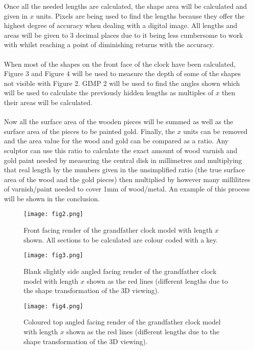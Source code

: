 \documentclass[a4paper,12pt]{article}
\begin{document}
Once all the needed lengths are calculated, the shape area will be calculated and given in $x$ units. Pixels are being used to find the lengths because they offer the highest degree of accuracy when dealing with a digital image. All lengths and areas will be given to 3 decimal places due to it being less cumbersome to work with whilst reaching a point of diminishing returns with the accuracy.\\\\
When most of the shapes on the front face of the clock have been calculated, Figure 3 and Figure 4 will be used to measure the depth of some of the shapes not visible with Figure 2. GIMP 2 will be used to find the angles shown which will be used to calculate the previously hidden lengths as multiples of $x$ then their areas will be calculated.\\\\
Now all the surface area of the wooden pieces will be summed as well as the surface area of the pieces to be painted gold. Finally, the $x$ units can be removed and the area value for the wood and gold can be compared as a ratio. Any sculptor can use this ratio to calculate the exact amount of wood varnish and gold paint needed by measuring the central disk in millimetres and multiplying that real length by the numbers given in the unsimplified ratio (the true surface area of the wood and the gold pieces) then multiplied by however many millilitres of varnish/paint needed to cover 1mm of wood/metal. An example of this process will be shown in the conclusion.\\

\begin{figure}
\begin{center}
\texttt{[image: fig2.png]}
\caption{Front facing render of the grandfather clock model with length $x$ shown. All sections to be calculated are colour coded with a key.}
\label{fig:clock2}
\end{center}
\end{figure}
\begin{figure}
\begin{center}
\texttt{[image: fig3.png]}
\caption{Blank slightly side angled facing render of the grandfather clock model with length $x$ shown as the red lines (different lengths due to the shape transformation of the 3D viewing).}
\label{fig:clock3}
\end{center}
\end{figure}
\begin{figure}
\begin{center}
\texttt{[image: fig4.png]}
\caption{Coloured top angled facing render of the grandfather clock model with length $x$ shown as the red lines (different lengths due to the shape transformation of the 3D viewing).}
\label{fig:clock4}
\end{center}
\end{figure}
\end{document}
